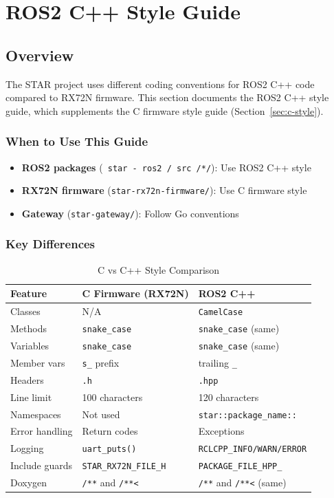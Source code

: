 \section{ROS2 C++ Style Guide}
\label{sec:ros2_cpp_style}

\subsection{Overview}

The STAR project uses different coding conventions for ROS2 C++ code compared to RX72N firmware. This section documents the ROS2 C++ style guide, which supplements the C firmware style guide (Section~\ref{sec:c-style}).

\subsubsection{When to Use This Guide
}

\begin{itemize}
  \item \textbf{ROS2 packages} (\texttt{
  star - ros2 / src /*/}): Use ROS2 C++ style
\item \textbf{RX72N firmware} (\texttt{star-rx72n-firmware/}): Use C firmware
style \item \textbf{Gateway} (\texttt{star-gateway/}): Follow Go conventions
\end{itemize}

\subsubsection{Key Differences}

\begin{table}[H]
\centering
\begin{tabular}{|l|l|l|}
\hline
\textbf{Feature} & \textbf{C Firmware (RX72N)} & \textbf{ROS2 C++} \\
\hline
Classes & N/A & \texttt{CamelCase} \\
Methods & \texttt{snake\_case} & \texttt{snake\_case} (same) \\
Variables & \texttt{snake\_case} & \texttt{snake\_case} (same) \\
Member vars & \texttt{s\_} prefix & trailing \texttt{\_} \\
Headers & \texttt{.h} & \texttt{.hpp} \\
Line limit & 100 characters & 120 characters \\
Namespaces & Not used & \texttt{star::package\_name::} \\
Error handling & Return codes & Exceptions \\
Logging & \texttt{uart\_puts()} & \texttt{RCLCPP\_INFO/WARN/ERROR} \\
Include guards & \texttt{STAR\_RX72N\_FILE\_H} & \texttt{PACKAGE\_FILE\_HPP\_}
\\
Doxygen & \texttt{/**} and \texttt{/**<} & \texttt{/**} and \texttt{/**<} (same)
\\ \hline \end{tabular} \caption{C vs C++ Style Comparison}
\label{tab:c_vs_cpp_style}
\end{table}

